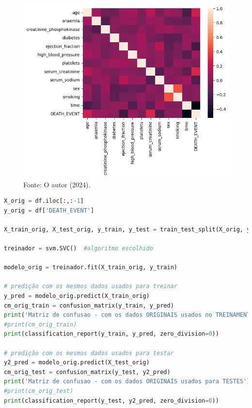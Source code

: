 \begin{figure}[H]
\centering
\caption{Mapa de correlação dados clínicos}
\includegraphics[width=1\linewidth]{apendices/fig/6_IAA006_1.png}
\caption*{Fonte: O autor (2024).}
\end{figure}


\begin{lstlisting}[language=Python, style=input]
X_orig = df.iloc[:,:-1]
y_orig = df['DEATH_EVENT']

X_train_orig, X_test_orig, y_train, y_test = train_test_split(X_orig, y_orig, test_size=0.20, stratify=y_orig,random_state=10)

treinador = svm.SVC()  #algoritmo escolhido

modelo_orig = treinador.fit(X_train_orig, y_train)

# predição com os mesmos dados usados para treinar
y_pred = modelo_orig.predict(X_train_orig)
cm_orig_train = confusion_matrix(y_train, y_pred)
print('Matriz de confusao - com os dados ORIGINAIS usados no TREINAMENTO')
#print(cm_orig_train)
print(classification_report(y_train, y_pred, zero_division=0))

# predição com os mesmos dados usados para testar
y2_pred = modelo_orig.predict(X_test_orig)
cm_orig_test = confusion_matrix(y_test, y2_pred)
print('Matriz de confusao - com os dados ORIGINAIS usados para TESTES')
#print(cm_orig_test)
print(classification_report(y_test, y2_pred, zero_division=0))
\end{lstlisting}


